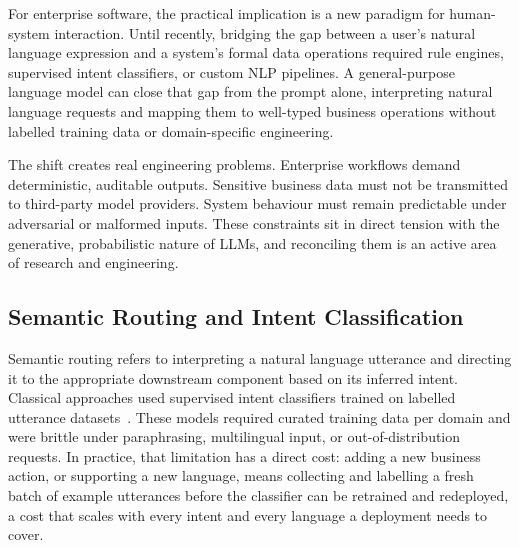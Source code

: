 For enterprise software, the practical implication is a new paradigm for human-system interaction. Until recently, bridging the gap between a user's natural language expression and a system's formal data operations required rule engines, supervised intent classifiers, or custom NLP pipelines. A general-purpose language model can close that gap from the prompt alone, interpreting natural language requests and mapping them to well-typed business operations without labelled training data or domain-specific engineering.

The shift creates real engineering problems. Enterprise workflows demand deterministic, auditable outputs. Sensitive business data must not be transmitted to third-party model providers. System behaviour must remain predictable under adversarial or malformed inputs. These constraints sit in direct tension with the generative, probabilistic nature of LLMs, and reconciling them is an active area of research and engineering.

\subsection{Semantic Routing and Intent Classification}
\label{subsec:background_semantic_routing}

Semantic routing refers to interpreting a natural language utterance and directing it to the appropriate downstream component based on its inferred intent. Classical approaches used supervised intent classifiers trained on labelled utterance datasets~\cite{larson2019evaluation}. These models required curated training data per domain and were brittle under paraphrasing, multilingual input, or out-of-distribution requests. In practice, that limitation has a direct cost: adding a new business action, or supporting a new language, means collecting and labelling a fresh batch of example utterances before the classifier can be retrained and redeployed, a cost that scales with every intent and every language a deployment needs to cover.

